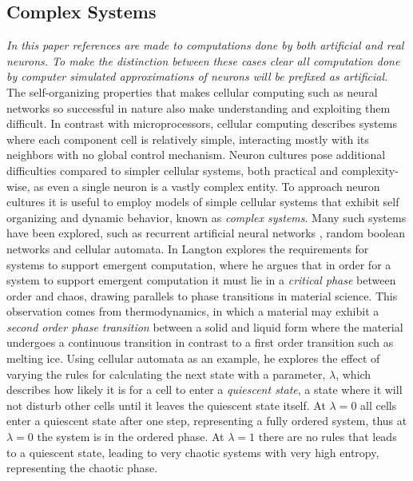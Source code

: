 \subsection{Complex Systems}
\textit{
  In this paper references are made to computations done by both artificial and real
  neurons.
  To make the distinction between these cases clear all computation done by
  computer simulated approximations of neurons will be prefixed as artificial.
}\\
The self-organizing properties that makes cellular computing such as
neural networks so successful in nature also make understanding and exploiting
them difficult.
In contrast with microprocessors, cellular computing describes systems where
each component cell is relatively simple, interacting mostly with its neighbors
with no global control mechanism.
Neuron cultures pose additional difficulties compared to simpler cellular
systems, both practical and complexity-wise, as even a single neuron is a vastly
complex entity.
To approach neuron cultures it is useful to employ models of simple cellular
systems that exhibit self organizing and dynamic behavior, known as \textit{complex
 systems}.
Many such systems have been explored, such as recurrent artificial neural
networks \cite{bertschinger_real-time_2004}, random boolean networks
\cite{gershenson_introduction_2004} and cellular automata.
In \cite{langton_computation_1990} Langton explores the requirements for systems
to support emergent computation, where
he argues that in order for a system to support emergent computation it must
lie in a \textit{critical phase} between order and chaos, drawing parallels to
phase transitions in material science.
This observation comes from thermodynamics, in which a material may exhibit a
\textit{second order phase transition} between a solid and liquid form where the
material undergoes a continuous transition in contrast to a first order
transition such as melting ice.
Using cellular automata as an example, he explores the effect of varying the
rules for calculating the next state with a parameter, $\lambda$, which
describes how likely it is for a cell to enter a \textit{quiescent state}, a state
where it will not disturb other cells until it leaves the quiescent state itself.
At $\lambda = 0$ all cells enter a quiescent state after one step, representing
a fully ordered system, thus at $\lambda = 0$ the system is in the ordered phase.
At $\lambda = 1$ there are no rules that leads to a quiescent state, leading to
very chaotic systems with very high entropy, representing the chaotic phase.

